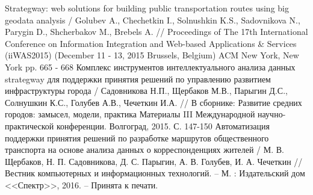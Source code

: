 \renewcommand{\bibname}{Публикации по теме диссертации}
\begin{thebibliography}{10}
     Strategway: web solutions for building public transportation routes using big geodata 
        analysis / Golubev A., Chechetkin I., Solnushkin K.S., Sadovnikova N., Parygin D., Shcherbakov M., 
        Brebels A. // Proceedings of The 17th International Conference on Information Integration and 
        Web-based Applications \& Services (iiWAS2015) (December 11 - 13, 2015 Brussels, Belgium) 
        ACM New York, New York pp. 665 - 668
     Комплекс инструментов интеллектуального анализа данных strategway для поддержки 
        принятия решений по управлению развитием инфраструктуры города / Садовникова Н.П., Щербаков М.В., 
        Парыгин Д.С., Солнушкин К.С., Голубев А.В., Чечеткин И.А. // В сборнике: Развитие средних 
        городов: замысел, модели, практика Материалы III Международной научно-практической конференции. 
        Волгоград, 2015. С. 147-150
     Автоматизация поддержки принятия решений по разработке маршрутов общественного 
        транспорта на основе анализа данных о корреспонденциях жителей / М. В. Щербаков, 
        Н. П. Садовникова, Д. С. Парыгин, А. В. Голубев, И. А. Чечеткин // Вестник компьютерных и 
        информационных технологий. -- М. : Издательский дом <<Спектр>>, 2016. -- Принята к печати.
\end{thebibliography}